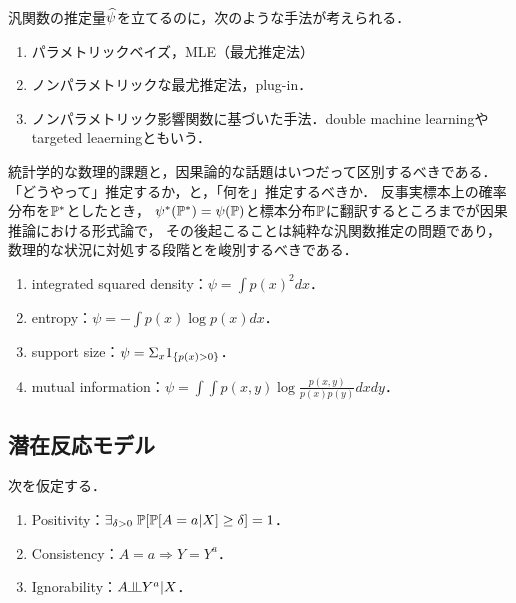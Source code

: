 \documentclass[uplatex,dvipdfmx]{jsreport}
\begin{document}
\begin{example}
    汎関数の推定量$\widehat{\psi}$を立てるのに，次のような手法が考えられる．
    \begin{enumerate}
        \item パラメトリックベイズ，MLE（最尤推定法）
        \item ノンパラメトリックな最尤推定法，plug-in．
        \item ノンパラメトリック影響関数に基づいた手法．double machine learningやtargeted leaerningともいう．
    \end{enumerate}
\end{example}

\begin{remark}
    統計学的な数理的課題と，因果論的な話題はいつだって区別するべきである．
    「どうやって」推定するか，と，「何を」推定するべきか．
    反事実標本上の確率分布を$\mathbb{P}^*$としたとき，
    $\psi^*(\mathbb{P}^*)=\psi(\mathbb{P})$と標本分布$\mathbb{P}$に翻訳するところまでが因果推論における形式論で，
    その後起こることは純粋な汎関数推定の問題であり，
    数理的な状況に対処する段階とを峻別するべきである．
\end{remark}

\begin{example}[因果推論以外の文脈で生じる汎関数推定]\mbox{}
    \begin{enumerate}
        \item integrated squared density：$\psi=\int p(x)^2dx$．
        \item entropy：$\psi=-\int p(x)\log p(x)dx$．
        \item support size：$\psi=\Sigma_x1_{\left\{p(x)>0\right\}}$．
        \item mutual information：$\psi=\int\int p(x,y)\log\frac{p(x,y)}{p(x)p(y)}dxdy$．
    \end{enumerate}
\end{example}

\subsection{潜在反応モデル}

\begin{axiom}[ATE]
    次を仮定する．
    \begin{enumerate}
        \item Positivity：$\exists_{\delta>0}\;\mathbb{P}[\mathbb{P}[A=a|X]\ge\delta]=1$．
        \item Consistency：$A=a\Rightarrow Y=Y^a$．
        \item Ignorability：$A\indep Y^a|X$．
    \end{enumerate}
\end{axiom}
\end{document}

